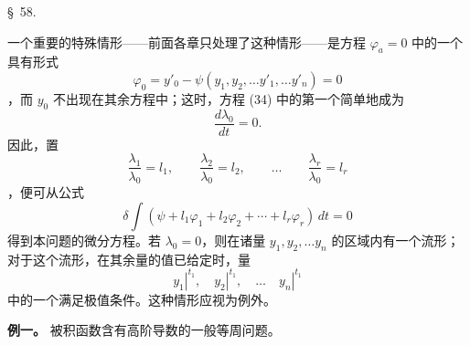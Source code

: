 \documentclass[11pt,a4paper,leqno]{article}
\begin{document}
\begin{center}
{\large \S~58.}
\end{center}

一个重要的特殊情形——前面各章只处理了这种情形——是方程 $\varphi_a=0$ 中的一个具有形式
\[
\varphi_0=y'_0-\psi(y_1,y_2,\ldots y'_1,\ldots y'_n)=0
\]
，而 $y_0$ 不出现在其余方程中；这时，方程 (34) 中的第一个简单地成为
\[
\frac{d\lambda_0}{dt}=0.
\]
因此，置
\[
\frac{\lambda_1}{\lambda_0}=l_1,\qquad
\frac{\lambda_2}{\lambda_0}=l_2,\qquad\ldots\qquad
\frac{\lambda_r}{\lambda_0}=l_r
\]
，便可从公式
\[
\delta\int(\psi+l_1\varphi_1+l_2\varphi_2+\cdots+l_r\varphi_r)\,dt=0
\]
得到本问题的微分方程。若 $\lambda_0=0$，则在诸量 $y_1,y_2,\ldots y_n$ 的区域内有一个流形；对于这个流形，在其余量的值已给定时，量
\[
\left.y_1\right|^{t_1},\quad
\left.y_2\right|^{t_1},\quad\ldots\quad
\left.y_n\right|^{t_1}
\]
中的一个满足极值条件。这种情形应视为例外。

\noindent\textbf{例一。} 被积函数含有高阶导数的一般等周问题。
\end{document}
